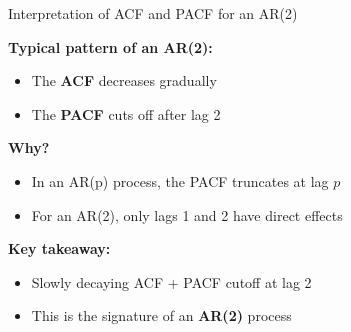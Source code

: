 \documentclass[aspectratio=169]{beamer}
\begin{document}
\begin{frame}{Interpretation of ACF and PACF for an AR(2)}

\textbf{Typical pattern of an AR(2):}
\begin{itemize}
    \item The \textbf{ACF} decreases gradually
    \item The \textbf{PACF} cuts off after lag 2
\end{itemize}

\vspace{0.4cm}

\textbf{Why?}
\begin{itemize}
    \item In an AR(p) process, the PACF truncates at lag $p$
    \item For an AR(2), only lags 1 and 2 have direct effects
\end{itemize}

\vspace{0.4cm}

\textbf{Key takeaway:}
\begin{itemize}
    \item Slowly decaying ACF + PACF cutoff at lag 2
    \item This is the signature of an \textbf{AR(2)} process
\end{itemize}

\end{frame}
\end{document}
